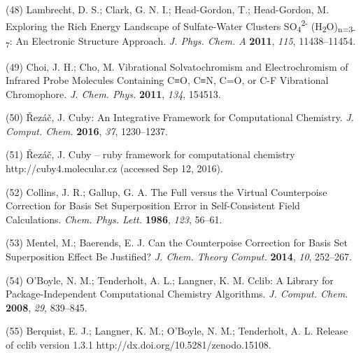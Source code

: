 (48) Lambrecht, D. S.; Clark, G. N. I.; Head-Gordon, T.; Head-Gordon, M.  Exploring the Rich Energy Landscape of Sulfate-Water Clusters SO\textsubscript{4}\textsuperscript{2-} (H\textsubscript{2}O)\textsubscript{n=3-7}: An Electronic Structure Approach. \emph{J. Phys. Chem. A} \textbf{2011}, \emph{115}, 11438--11454.

(49) Choi, J. H.; Cho, M. Vibrational Solvatochromism and Electrochromism of Infrared Probe Molecules Containing C≡O, C≡N, C=O, or C-F Vibrational Chromophore. \emph{J. Chem. Phys.} \textbf{2011}, \emph{134}, 154513.

(50) Řezáč, J. Cuby: An Integrative Framework for Computational Chemistry. \emph{J. Comput. Chem.} \textbf{2016}, \emph{37}, 1230--1237.

(51) Řezáč, J. Cuby -- ruby framework for computational chemistry http://cuby4.molecular.cz (accessed Sep 12, 2016).

(52) Collins, J. R.; Gallup, G. A. The Full versus the Virtual Counterpoise Correction for Basis Set Superposition Error in Self-Consistent Field Calculations. \emph{Chem. Phys. Lett.}  \textbf{1986}, \emph{123}, 56--61.

(53) Mentel, M.; Baerends, E. J. Can the Counterpoise Correction for Basis Set Superposition Effect Be Justified? \emph{J. Chem. Theory Comput.} \textbf{2014}, \emph{10}, 252--267.

(54) O'Boyle, N. M.; Tenderholt, A. L.; Langner, K. M. Cclib: A Library for Package-Independent Computational Chemistry Algorithms. \emph{J.  Comput. Chem.} \textbf{2008}, \emph{29}, 839--845.

(55) Berquist, E. J.; Langner, K. M.; O'Boyle, N. M.; Tenderholt, A. L.  Release of cclib version 1.3.1 http://dx.doi.org/10.5281/zenodo.15108.

